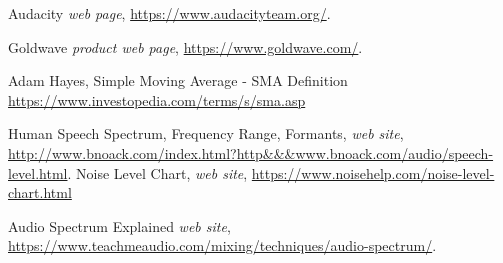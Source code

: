 \documentclass[10pt,a4paper]{report}
\begin{document}
\begin{thebibliography}{9}
	Audacity
	\textit{web page},
	\url{https://www.audacityteam.org/}.
	
	Goldwave
	\textit{product web page},
	\url{https://www.goldwave.com/}.
	
	Adam Hayes, Simple Moving Average - SMA Definition
	\url{https://www.investopedia.com/terms/s/sma.asp}
	
	Human Speech Spectrum, Frequency Range, Formants, 
	\textit{web site},
	\url{http://www.bnoack.com/index.html?http&&&www.bnoack.com/audio/speech-level.html}.
	Noise Level Chart, \textit{web site},
	\url{https://www.noisehelp.com/noise-level-chart.html}
	
	Audio Spectrum Explained
	\textit{web site},
	\url{https://www.teachmeaudio.com/mixing/techniques/audio-spectrum/}.
\end{thebibliography}

\printglossaries
\end{document}
